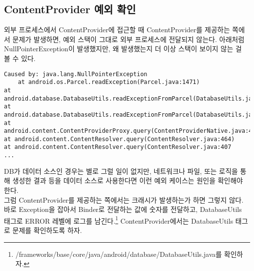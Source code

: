 \subsection{ContentProvider 예외 확인}
외부 프로세스에서 ContentProvider에 접근할 때 ContentProvider를 제공하는 쪽에서 문제가 발생하면, 예외 스택이 그대로 외부 프로세스에 전달되지 않는다.
아래처럼 NullPointerException이 발생했지만, 왜 발생했는지 더 이상 스택이 보이지 않는 걸 볼 수 있다.
\begin{lstlisting}[frame=single] 
Caused by: java.lang.NullPointerException 
	at android.os.Parcel.readException(Parcel.java:1471) 
at android.database.DatabaseUtils.readExceptionFromParcel(DatabaseUtils.java:185) 
at android.database.DatabaseUtils.readExceptionFromParcel(DatabaseUtils.java:137) 
at android.content.ContentProviderProxy.query(ContentProviderNative.java:413) 
at android.content.ContentResolver.query(ContentResolver.java:464) 
at android.content.ContentResolver.query(ContentResolver.java:407
...
\end{lstlisting}
DB가 데이터 소스인 경우는 별로 그럴 일이 없지만, 네트워크나 파일, 또는 로직을 통해 생성한 결과 등을 데이터 소스로 사용한다면 이런 예외 케이스는 원인을 확인해야 한다.\\

그럼 ContentProvider를 제공하는 쪽에서는 크래시가 발생하는가 하면 그렇지 않다. 바로 Exception을 잡아서 Binder로 전달하는 값에 숫자를 전달하고, DatabaseUtils 태그로 ERROR 레벨에 로그를 남긴다.\footnote{/frameworks/base/core/java/android/database/DatabaseUtils.java를 확인하자.}
ContentProvider에서는 DatabaseUtils 태그로 문제를 확인하도록 하자.

